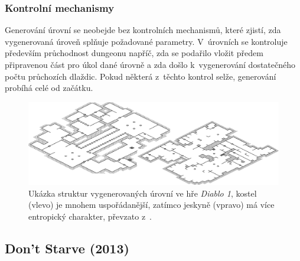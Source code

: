 \subsubsection{Kontrolní mechanismy}
Generování úrovní se neobejde bez kontrolních mechanismů, které zjistí, zda vygenerovaná úroveň splňuje požadované parametry.
V~úrovních se kontroluje především průchodnost dungeonu napříč, zda se podařilo vložit předem připravenou část pro úkol dané úrovně a zda došlo k~vygenerování dostatečného počtu průchozích dlaždic.
Pokud některá z~těchto kontrol selže, generování probíhá celé od začátku.
\begin{figure}[hbt]
    \centering
    \includegraphics[width=1.0\textwidth]{obrazky/diablo_1_maps.png}
    \caption{Ukázka struktur vygenerovaných úrovní ve hře \textit{Diablo 1}, kostel (vlevo) je mnohem uspořádanější, zatímco jeskyně (vpravo) má více entropický charakter, převzato z~\cite{lit:diablo_1}.}
    \label{img:diablo_1_maps}
\end{figure}


\subsection{Don't Starve (2013)}


